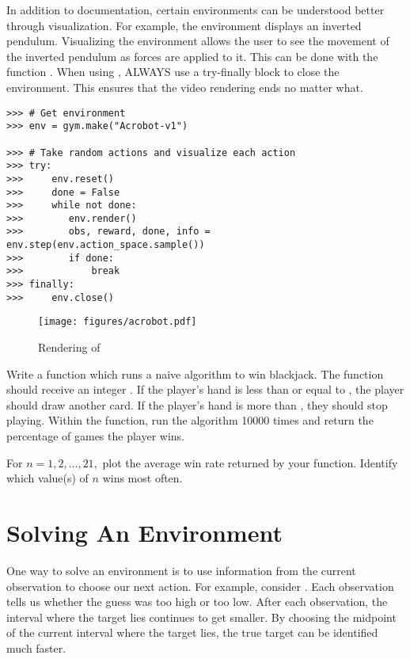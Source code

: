 In addition to documentation, certain environments can be understood better through visualization.
For example, the environment  displays an inverted pendulum.
Visualizing the environment allows the user to see the movement of the inverted pendulum as forces are applied to it.
This can be done with the function .
When using , ALWAYS use a try-finally block to close the environment.
This ensures that the video rendering ends no matter what.

\begin{lstlisting}
>>> # Get environment
>>> env = gym.make("Acrobot-v1")

>>> # Take random actions and visualize each action
>>> try:
>>>     env.reset()
>>>     done = False
>>>     while not done:
>>>        env.render()
>>>        obs, reward, done, info = env.step(env.action_space.sample())
>>>        if done:
>>>            break
>>> finally:
>>>     env.close()
\end{lstlisting}

\begin{figure}[H]
\texttt{[image: figures/acrobot.pdf]}
\caption{Rendering of }
\end{figure}

\begin{problem}
Write a function  which runs a naive algorithm to win blackjack.
The function should receive an integer .
If the player's hand is less than or equal to , the player should draw another card.
If the player's hand is more than , they should stop playing.
Within the function, run the algorithm 10000 times and return the percentage of games the player wins.

For $n=1,2,\ldots,21,$ plot the average win rate returned by your function. Identify which value(s) of $n$ wins most often.

\label{prob:blackjack}
\end{problem}

\section*{Solving An Environment}

One way to solve an environment is to use information from the current observation to choose our next action.
For example, consider .
Each observation tells us whether the guess was too high or too low.
After each observation, the interval where the target lies continues to get smaller.
By choosing the midpoint of the current interval where the target lies, the true target can be identified much faster.

